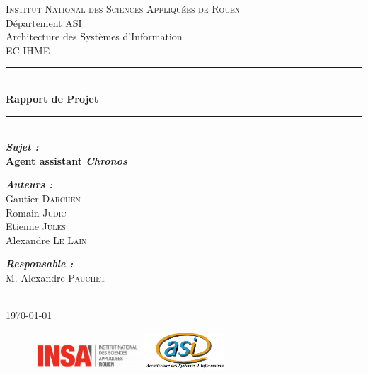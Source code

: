 \begin{titlepage}
\newcommand{\HRule}{\rule{\linewidth}{0.5mm}} 
\center 
{}\textsc{\huge Institut National des Sciences Appliquées de Rouen}\\[0.7cm] 
\LARGE Département ASI~\\[0.5cm]
\Large{Architecture des Systèmes d'Information} ~\\[1.5cm]
\textsc{\Large EC IHME}\\[1cm] 

\HRule \\[0.4cm]
{ \huge \bfseries Rapport de Projet}\\[0.2cm] \HRule \\[1.5cm]
 
\LARGE \emph{\textbf{Sujet :}} \\
\textbf{Agent assistant \emph{Chronos}}\\[2cm]

\large
\begin{minipage}[c]{.3\linewidth}
	\begin{flushleft}
       \emph{\textbf{Auteurs :}}\\
       Gautier \textsc{Darchen}\\
       Romain \textsc{Judic}\\
       Etienne \textsc{Jules}\\
        Alexandre \textsc{Le Lain}
        
	\end{flushleft}
   \end{minipage} \hfill
   \begin{minipage}[c]{.3\linewidth}
  	 \begin{flushright}
 	\emph{\textbf{Responsable :}}\\
		M. Alexandre \textsc{Pauchet}
	\end{flushright}
   \end{minipage}
   
~\\[2cm]

\vfill{\today} 

\begin{figure}
\includegraphics[width=4cm]{images/LogoINSA.png}\hfill
\includegraphics[width=3cm]{images/logoasi.png}
\end{figure}


 \end{titlepage}
